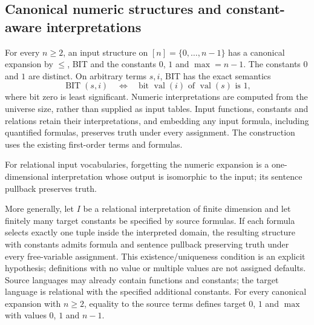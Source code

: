 \begin{result}
\subsection{Canonical numeric structures and constant-aware interpretations}
For every $n\ge2$, an input structure on $[n]=\{0,\ldots,n-1\}$ has a
canonical expansion by $\le$, BIT and the constants $0$, $1$ and $\max=n-1$.
The constants $0$ and $1$ are distinct. On arbitrary terms $s,i$, BIT has the
exact semantics
\[
\operatorname{BIT}(s,i)\quad\Longleftrightarrow\quad
\text{bit }\operatorname{val}(i)\text{ of }\operatorname{val}(s)\text{ is }1,
\]
where bit zero is least significant. Numeric interpretations are computed
from the universe size, rather than supplied as input tables. Input functions,
constants and relations retain their interpretations, and embedding any input
formula, including quantified formulas, preserves truth under every assignment.
The construction uses the existing first-order terms and formulas.

For relational input vocabularies, forgetting the numeric expansion is a
one-dimensional interpretation whose output is isomorphic to the input;
its sentence pullback preserves truth.

More generally, let $I$ be a relational interpretation of finite dimension and
let finitely many target constants be specified by source formulas. If each
formula selects exactly one tuple inside the interpreted domain, the resulting
structure with constants admits formula and sentence pullback preserving truth
under every free-variable assignment. This existence/uniqueness condition is an
explicit hypothesis; definitions with no value or multiple values are not
assigned defaults. Source languages may already contain functions and constants;
the target language is relational with the specified additional constants.
For every canonical expansion with $n\ge2$, equality to the source terms defines
target $0$, $1$ and $\max$ with values $0$, $1$ and $n-1$.


\end{result}
